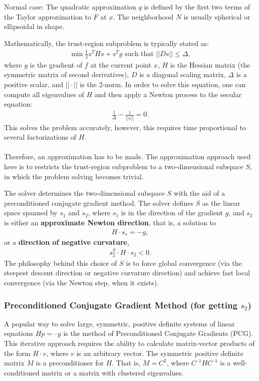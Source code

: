 \documentclass[11pt, a4paper]{article}
\theoremstyle{definition}
\begin{document}
Normal case: The quadratic approximation $q$ is defined by the first two terms of the Taylor approximation to $F$ at $x$. 
The neighborhood $N$ is usually spherical or ellipsoidal in shape. 

Mathematically, the trust-region subproblem is typically stated as:
\begin{align*}
\min{\frac{1}{2}s^T Hs+s^Tg \text{ such that } ||Ds|| \leq \Delta},
\end{align*}
where $g$ is the gradient of $f$ at the current point $x$, $H$ is the Hessian matrix (the symmetric matrix of second derivatives), $D$ is a diagonal scaling matrix, $\Delta$ is a positive scalar, and $||\cdot ||$ is the 2-norm.
In order to solve this equation, one can compute all eigenvalues of $H$ and then apply a Newton process to the secular equation:
\begin{align*}
\frac{1}{\Delta}- \frac{1}{||s||}=0.
\end{align*}
This solves the problem accurately, however, this requires time proportional to several factorizations of $H$.
\\
\\
Therefore, an approximation has to be made. The approximation approach used here is to restricts the trust-region subproblem to a two-dimensional subspace $S$, in which the problem solving becomes trivial.

The solver determines the two-dimensional subspace $S$ with the aid of a preconditioned conjugate gradient method. The solver defines $S$ as the linear space spanned by $s_1$ and $s_2$, where $s_1$ is in the direction of the gradient $g$, and $s_2$ is either an \textbf{approximate Newton direction}, that is, a solution to
\begin{align*}
H \cdot s_s = - g,
\end{align*}
or a \textbf{direction of negative curvature},
\begin{align*}
s^T_2 \cdot H \cdot s_2  < 0.
\end{align*}
The philosophy behind this choice of $S$ is to force global convergence (via the steepest descent direction or negative curvature direction) and achieve fast local convergence (via the Newton step, when it exists).


\subsubsection{Preconditioned Conjugate Gradient Method (for getting $s_2$)}
A popular way to solve large, symmetric, positive definite systems of linear equations $Hp = –g$ is the method of Preconditioned Conjugate Gradients (PCG). This iterative approach requires the ability to calculate matrix-vector products of the form $H \cdot v$, where $v$ is an arbitrary vector. The symmetric positive definite matrix $M$ is a preconditioner for $H$. That is, $M = C^2$, where $C^{–1}HC^{–1}$ is a well-conditioned matrix or a matrix with clustered eigenvalues.
\end{document}

